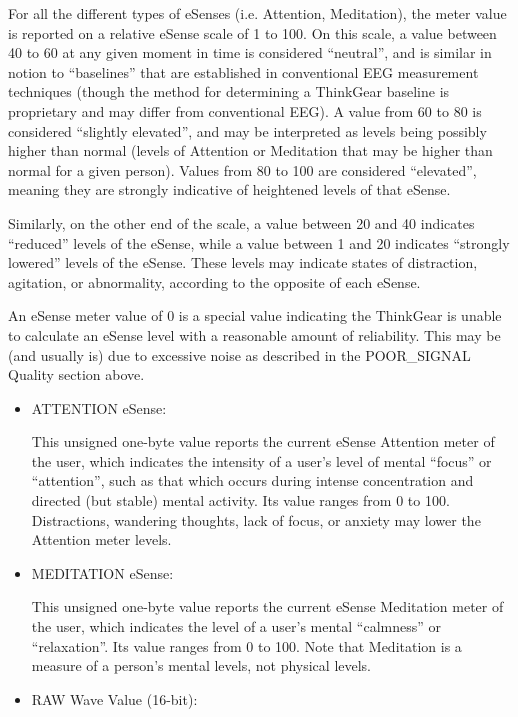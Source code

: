 \documentclass[12pt]{article}
\begin{document}
\begin{enumerate}
\begin{enumerate}
\begin{enumerate}
For all the different types of eSenses (i.e. Attention, Meditation), the meter value is reported on a relative eSense scale of 1 to 100. On this scale, a value between 40 to 60 at any given moment in time is considered “neutral”, and is similar in notion to “baselines” that are established in conventional EEG measurement techniques (though the method for determining a ThinkGear baseline is proprietary and may differ from conventional EEG). A value from 60 to 80 is considered “slightly elevated”, and may be interpreted as levels being possibly higher than normal (levels of Attention or Meditation that may be higher than normal for a given person). Values from 80 to 100 are considered “elevated”, meaning they are strongly indicative of heightened levels of that eSense.

Similarly, on the other end of the scale, a value between 20 and 40 indicates “reduced” levels of the eSense, while a value between 1 and 20 indicates “strongly lowered” levels of the eSense. These levels may indicate states of distraction, agitation, or abnormality, according to the opposite of each eSense. 

An eSense meter value of 0 is a special value indicating the ThinkGear is unable to calculate an eSense level with a reasonable amount of reliability. This may be (and usually is) due to excessive noise as described in the POOR\_SIGNAL Quality section above.
\end{enumerate}
\begin{itemize}
	\item ATTENTION eSense:

This unsigned one-byte value reports the current eSense Attention meter of the user, which indicates the intensity of a user's level of mental “focus” or “attention”, such as that which occurs during intense concentration and directed (but stable) mental activity. Its value ranges from 0 to 100. Distractions, wandering thoughts, lack of focus, or anxiety may lower the Attention meter levels.


	\item MEDITATION eSense:


This unsigned one-byte value reports the current eSense Meditation meter of the user, which indicates the level of a user's mental “calmness” or “relaxation”. Its value ranges from 0 to 100. Note that Meditation is a measure of a person's mental levels, not physical levels.


	\item RAW Wave Value (16-bit):



\end{itemize}
\end{enumerate}
\end{enumerate}
\end{document}
